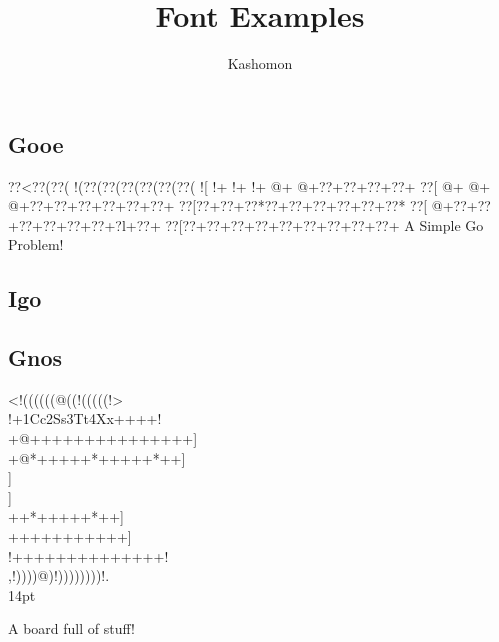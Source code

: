 \documentclass{article}
\begin{document}
\title{Font Examples}
\author{Kashomon}
\maketitle

\begin{center}
\section*{Gooe}
{\goo
\0??<\0??(\0??(\- !(\0??(\0??(\0??(\0??(\0??(\0??(
\- ![\- !+\- !+\- !+\- @+\- @+\0??+\0??+\0??+\0??+
\0??[\- @+\- @+\- @+\0??+\0??+\0??+\0??+\0??+\0??+
\0??[\0??+\0??+\0??*\0??+\0??+\0??+\0??+\0??+\0??*
\0??[\- @+\0??+\0??+\0??+\0??+\0??+\0??+\0?l+\0??+
\0??[\0??+\0??+\0??+\0??+\0??+\0??+\0??+\0??+\0??+
}
A Simple Go Problem!
\end{center}

\begin{center}
\section*{Igo}
\end{center}

\newpage
\begin{center}
\section*{Gnos}
{
{
\gnos%
<!((((((@((!(((((!>\\
!+1Cc2Ss3Tt4Xx++++!\\
+@+++++++++++++++]\\
+@*+++++*+++++*++]\\}
{\gnosb{}}{\gnos]\\}
{\gnosw{}}{\gnos]\\
++*{\gnoswi{}}{\gnoswii{}}{\gnoswiii{}}{\gnosbi{}}{\gnosbii{}}{\gnosbiii{}}+++++*++]\\
++++{\gnoswl{}}{\gnosbl{}}+++++++]\\
!++++++++++++++!\\
,!))))@)!))))))))!.\\
}}
14pt

A board full of stuff!
\end{center}
\end{document}

